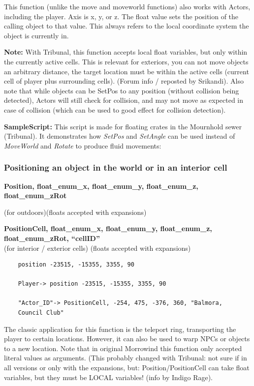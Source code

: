 This function (unlike the move and moveworld functions) also works with
Actors, including the player. Axis is x, y, or z. The float value sets
the position of the calling object to that value. This always refers to
the local coordinate system the object is currently in.

\textbf{Note:} With Tribunal, this function accepts local float
variables, but only within the currently active cells. This is relevant
for exteriors, you can not move objects an arbitrary distance, the
target location must be within the active cells (current cell of player
plus surrounding cells). (Forum info / reposted by Srikandi). Also note
that while objects can be SetPos to any position (without collision
being detected), Actors will still check for collision, and may not move
as expected in case of collision (which can be used to good effect for
collision detection).

\textbf{SampleScript:} This script is made for floating crates in the
Mournhold sewer (Tribunal). It demonstrates how \emph{SetPos} and
\emph{SetAngle} can be used instead of \emph{MoveWorld} and
\emph{Rotate} to produce fluid movements:



\hypertarget{positioning-an-object-in-the-world-or-in-an-interior-cell}{%
\subsubsection{Positioning an object in the world or in an interior
cell}\label{positioning-an-object-in-the-world-or-in-an-interior-cell}}

	\textbf{Position, float\_enum\_x, float\_enum\_y, float\_enum\_z,
		float\_enum\_zRot}

(for outdoors)(floats accepted with expansions)

	\textbf{PositionCell, float\_enum\_x, float\_enum\_y, float\_enum\_z,
		float\_enum\_zRot, ``cellID''\\
	}(for interior / exterior cells) (floats accepted with expansions)


\begin{lstlisting}	
	position -23515, -15355, 3355, 90
	
	Player-> position -23515, -15355, 3355, 90
	
	"Actor_ID"-> PositionCell, -254, 475, -376, 360, "Balmora,
	Council Club"
\end{lstlisting}

The classic application for this function is the teleport ring,
transporting the player to certain locations. However, it can also be
used to warp NPCs or objects to a new location. Note that in original
Morrowind this function only accepted literal values as arguments. (This
probably changed with Tribunal: not sure if in all versions or only with
the expansions, but: Position/PositionCell can take float variables, but
they must be LOCAL variables! (info by Indigo Rage).


